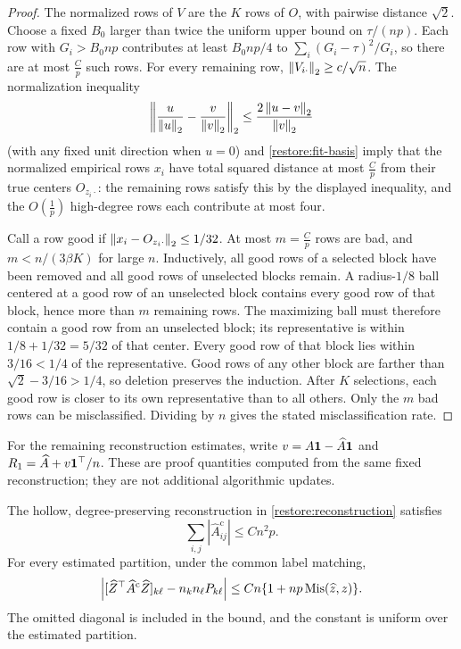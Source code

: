 \begin{proof}
The normalized rows of $V$ are the $K$ rows of $O$, with pairwise
distance $\sqrt2$. Choose a fixed $B_0$ larger than twice the
uniform upper bound on $\tau/(np)$. Each row with $G_i>B_0{np}$
contributes at least $B_0{np}/4$ to $\sum_i(G_i-\tau)^2/G_i$, so
there are at most $\frac{C}{p}$ such rows. For every remaining row,
$\left\lVert V_{i\cdot}\right\rVert_2\ge c/\sqrt n$. The normalization inequality
\[
 \left\|\frac u{\left\lVert u\right\rVert_2}-\frac v{\left\lVert v\right\rVert_2}\right\|_2
 \le\frac{2\left\lVert u-v\right\rVert_2}{\left\lVert v\right\rVert_2}
\]
(with any fixed unit direction when $u=0$) and
\eqref{restore:fit-basis} imply that the normalized empirical rows
$x_i$ have total squared distance at most $\frac{C}{p}$ from their true
centers $O_{z_i\cdot}$: the remaining rows satisfy this by the displayed
inequality, and the $O(\frac{1}{p})$ high-degree rows each contribute at most four.

Call a row good if $\left\lVert x_i-O_{z_i\cdot}\right\rVert_2\le1/32$.
At most $m=\frac{C}{p}$ rows are bad, and $m<n/(3\beta K)$ for large $n$.
Inductively, all good rows of a selected block have been removed and
all good rows of unselected blocks remain. A radius-$1/8$ ball
centered at a good row of an unselected block contains every good row
of that block, hence more than $m$ remaining rows. The maximizing
ball must therefore contain a good row from an unselected block;
its representative is within $1/8+1/32=5/32$ of that center.
Every good row of that block lies within $3/16<1/4$ of the
representative. Good rows of any other block are farther than
$\sqrt2-3/16>1/4$, so deletion preserves the induction.
After $K$ selections, each good row is closer to its own
representative than to all others. Only the $m$ bad rows can be
misclassified. Dividing by $n$ gives the stated misclassification rate.
\end{proof}

For the remaining reconstruction estimates, write
$v=A\mathbf 1-\widehat A\mathbf 1$ and $R_1=\widehat A+v\mathbf 1^\top/n$.
These are proof quantities computed from the same fixed reconstruction;
they are not additional algorithmic updates.

\begin{lemma}
\label{restore:fit-block-totals}
The hollow, degree-preserving reconstruction in
\eqref{restore:reconstruction} satisfies
\begin{equation}\label{restore:fit-global-absolute}
 \sum_{i,j}|\widehat A^{\mathrm{c}}_{ij}|\le Cn^2p.
\end{equation}
For every estimated partition, under the common label matching,
\begin{equation}\label{restore:fit-total-accuracy}
 \left|[\widehat Z^\top\widehat A^{\mathrm{c}}\widehat Z]_{k\ell}
                  -n_kn_\ell P_{k\ell}\right|
 \le Cn\{1+np\operatorname{Mis}(\widehat z,z)\}.
\end{equation}
The omitted diagonal is included in the bound, and the constant is
uniform over the estimated partition.
\end{lemma}

